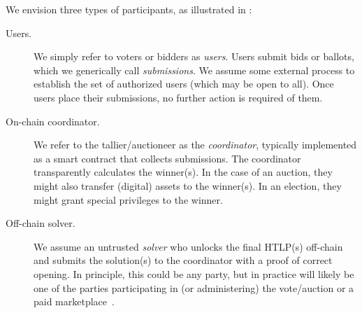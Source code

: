 


We envision three types of participants, as illustrated in :
\begin{description}
    \item[Users.] We simply refer to voters or bidders as \emph{users}. Users submit bids or ballots, which we generically call \emph{submissions}. We assume some external process to establish the set of authorized users (which may be open to all).  Once users place their submissions, no further action is required of them. 
    \item[On-chain coordinator.] We refer to the tallier/auctioneer as the \emph{coordinator}, typically implemented as a smart contract that collects submissions. The coordinator transparently calculates the winner(s). In the case of an auction, they might also transfer (digital) assets to the winner(s). In an election, they might grant special privileges to the winner.%
    \item[Off-chain solver.] We assume an untrusted \emph{solver} who unlocks the final HTLP(s) off-chain and submits the solution(s) to the coordinator with a proof of correct opening. In principle, this could be any party, but in practice will likely be one of the parties participating in (or administering) the vote/auction or a paid marketplace~\cite{EPRINT:Abadi23,CCS:TGBKS21}.
\end{description}